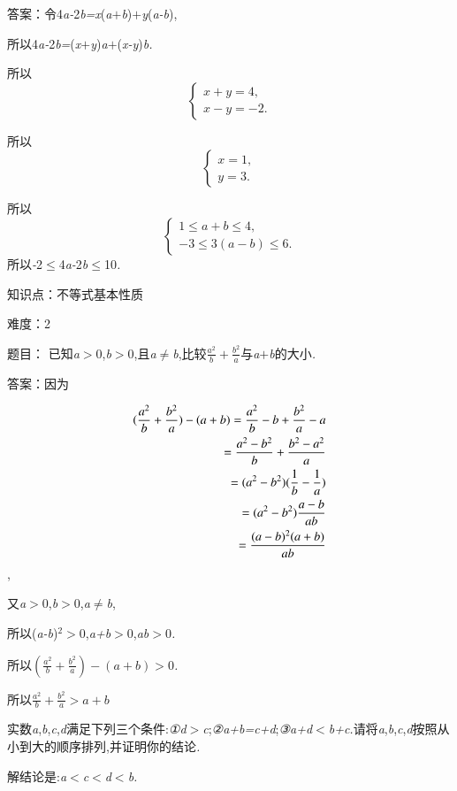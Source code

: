 \documentclass{article} %
\begin{document}
 答案：令4\textit{a-}2\textit{b=x}(\textit{a$+$b})\textit{$+$y}(\textit{a-b}),

所以4\textit{a-}2\textit{b=}(\textit{x$+$y})\textit{a$+$}(\textit{x-y})\textit{b.}

所以
\[
\begin{cases}
x+y=4,\\
x-y=-2.
\end{cases}
\]

所以
\[
\begin{cases}
x=1,\\
y=3.
\end{cases}
\]


所以
\[
\begin{cases}
1\leqslant a+b\leqslant 4,\\
-3 \leqslant 3(a-b) \leqslant 6.
\end{cases}
\]
所以\textit{-}2$\mathrm{\le}$4\textit{a-}2\textit{b}$\mathrm{\le}$10\textit{.}

知识点：不等式基本性质

难度：2

 题目： 已知\textit{a$>$}0,\textit{b$>$}0,且\textit{a}$\mathrm{\neq}$\textit{b},比较$\frac{a^2}{b}+\frac{b^2}{a}$与\textit{a$+$b}的大小\textit{.}

 答案：因为


\begin{align}
\notag
(\frac{a^2}{b}+\frac{b^2}{a}) - (a+b) = \frac{a^2}{b}-b+\frac{b^2}{a}-a\\\notag
=\frac{a^2-b^2}{b}+\frac{b^2-a^2}{a}\\\notag
=(a^2-b^2)(\frac{1}{b}-\frac{1}{a})\\\notag
=(a^2-b^2)\frac{a-b}{ab}\\\notag
=\frac{(a-b)^2(a+b)}{ab}
\end{align}
,

又\textit{a$>$}0,\textit{b$>$}0,\textit{a}$\mathrm{\neq}$\textit{b},

所以(\textit{a-b})${}^{2}$\textit{$>$}0,\textit{a+b$>$}0,\textit{ab$>$}0\textit{.}

所以$(\frac{a^2}{b}+\frac{b^2}{a})-(a+b)>0$\textit{.}

所以$\frac{a^2}{b}+\frac{b^2}{a}>a+b$

 
实数\textit{a},\textit{b},\textit{c},\textit{d}满足下列三个条件:\textit{①d$>$c};\textit{②a+b=c+d};\textit{③a+d$<$b+c.}请将\textit{a},\textit{b},\textit{c},\textit{d}按照从小到大的顺序排列,并证明你的结论\textit{.}

 解结论是:\textit{a$<$c$<$d$<$b.}
\end{document}
